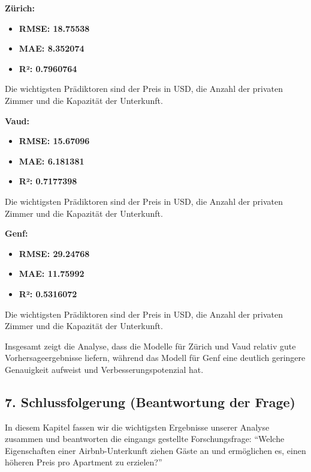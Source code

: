 \documentclass[
  journal,
]{IEEEtran}%
\begin{document}
\textbf{Zürich:}

\begin{itemize}
\item
  \textbf{RMSE: 18.75538}
\item
  \textbf{MAE: 8.352074}
\item
  \textbf{R²: 0.7960764}
\end{itemize}

Die wichtigsten Prädiktoren sind der Preis in USD, die Anzahl der
privaten Zimmer und die Kapazität der Unterkunft.

\textbf{Vaud:}

\begin{itemize}
\item
  \textbf{RMSE: 15.67096}
\item
  \textbf{MAE: 6.181381}
\item
  \textbf{R²: 0.7177398}
\end{itemize}

Die wichtigsten Prädiktoren sind der Preis in USD, die Anzahl der
privaten Zimmer und die Kapazität der Unterkunft.

\textbf{Genf:}

\begin{itemize}
\item
  \textbf{RMSE: 29.24768}
\item
  \textbf{MAE: 11.75992}
\item
  \textbf{R²: 0.5316072}
\end{itemize}

Die wichtigsten Prädiktoren sind der Preis in USD, die Anzahl der
privaten Zimmer und die Kapazität der Unterkunft.

Insgesamt zeigt die Analyse, dass die Modelle für Zürich und Vaud
relativ gute Vorhersageergebnisse liefern, während das Modell für Genf
eine deutlich geringere Genauigkeit aufweist und Verbesserungspotenzial
hat.

\hypertarget{schlussfolgerung-beantwortung-der-frage}{%
\subsection{7. Schlussfolgerung (Beantwortung der
Frage)}\label{schlussfolgerung-beantwortung-der-frage}}

In diesem Kapitel fassen wir die wichtigsten Ergebnisse unserer Analyse
zusammen und beantworten die eingangs gestellte Forschungsfrage:
``Welche Eigenschaften einer Airbnb-Unterkunft ziehen Gäste an und
ermöglichen es, einen höheren Preis pro Apartment zu erzielen?''
\end{document}
